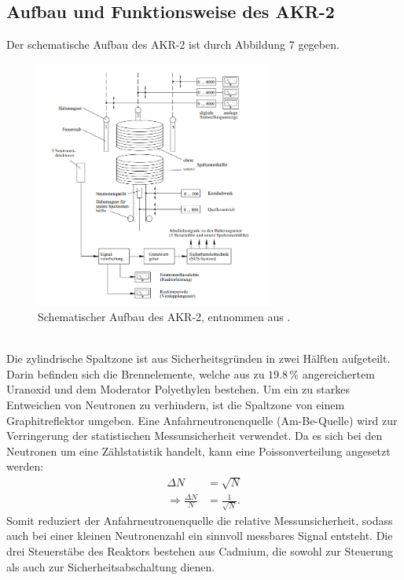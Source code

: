 \documentclass[german,  %
parskip=full,  %
]{scrartcl}
\begin{document}
\subsection{Aufbau und Funktionsweise des AKR-2}
Der schematische Aufbau des AKR-2 ist durch Abbildung 7 gegeben.
\\
\begin{figure}[h!]\centering
\includegraphics[width=0.7\textwidth]{aufbau}
\caption{Schematischer Aufbau des AKR-2, entnommen aus \cite{1}.}
\end{figure}
\\
Die zylindrische Spaltzone ist aus Sicherheitsgründen in zwei Hälften aufgeteilt. Darin befinden sich die Brennelemente, welche aus  zu $19.8\,\%$ angereichertem Uranoxid und dem Moderator Polyethylen bestehen. Um ein zu starkes Entweichen von Neutronen zu verhindern, ist die Spaltzone von einem Graphitreflektor umgeben. Eine Anfahrneutronenquelle (Am-Be-Quelle) wird zur Verringerung der statistischen Messunsicherheit verwendet. Da es sich bei den Neutronen um eine Zählstatistik handelt, kann eine Poissonverteilung angesetzt werden:
\begin{align}
\Delta N &= \sqrt{N} \\
\Rightarrow \frac{\Delta N}{N} &= \frac{1}{\sqrt{N}}.
\end{align}
Somit reduziert der Anfahrneutronenquelle die relative Messunsicherheit, sodass auch bei einer kleinen Neutronenzahl ein sinnvoll messbares Signal entsteht. Die drei Steuerstäbe des Reaktors bestehen aus Cadmium, die sowohl zur Steuerung als auch zur Sicherheitsabschaltung dienen.
\end{document}
